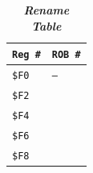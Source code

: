\begin{table}[!htp]
    \centering
    \begin{tabular}{@{} l l @{}}
        \toprule
        \texttt{Reg \#}  & \texttt{ROB \#} \\
        \midrule
        \texttt{\$F0}    & \texttt{--} \\ [.3em]
        \texttt{\$F2}    & \\ [.3em]
        \texttt{\$F4}    & \\ [.3em]
        \texttt{\$F6}    & \\ [.3em]
        \texttt{\$F8}    & \\
        \bottomrule
    \end{tabular}
    \caption*{\emph{\textbf{Rename Table}}}
\end{table}

